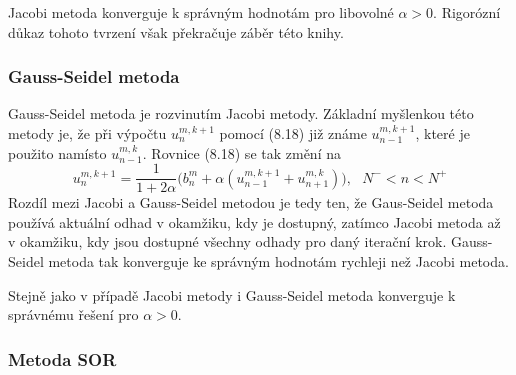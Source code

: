 \documentclass[a4paper]{book}
\begin{document}
Jacobi metoda konverguje k správným hodnotám pro libovolné $\alpha > 0$. Rigorózní důkaz tohoto tvrzení však překračuje záběr této knihy.

\subsubsection{Gauss-Seidel metoda}

Gauss-Seidel metoda je rozvinutím Jacobi metody. Základní myšlenkou této metody je, že při výpočtu $u_n^{m,k+1}$ pomocí (8.18) již známe $u_{n-1}^{m,k+1}$, které je použito namísto $u_{n-1}^{m,k}$. Rovnice (8.18) se tak změní na
\begin{equation*}
u_n^{m,k+1} = \frac{1}{1 + 2 \alpha} \Big( b_n^m + \alpha(u_{n-1}^{m,k+1} + u_{n+1}^{m,k}) \Big),~~~ N^{-} < n < N^{+}
\end{equation*}
Rozdíl mezi Jacobi a Gauss-Seidel metodou je tedy ten, že Gaus-Seidel metoda používá aktuální odhad v okamžiku, kdy je dostupný, zatímco Jacobi metoda až v okamžiku, kdy jsou dostupné všechny odhady pro daný iterační krok. Gauss-Seidel metoda tak konverguje ke správným hodnotám rychleji než Jacobi metoda.

Stejně jako v případě Jacobi metody i Gauss-Seidel metoda konverguje k správnému řešení pro $\alpha > 0$.

\subsubsection{Metoda SOR}
\end{document}
